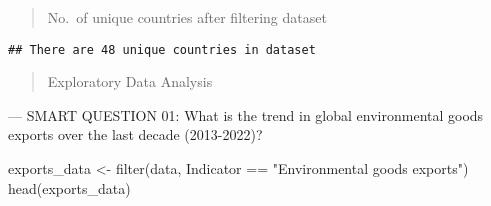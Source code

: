 \documentclass[
]{article}
\newenvironment{Shaded}{\begin{snugshade}}{\end{snugshade}}
\newcommand{\FunctionTok}[1]{\textcolor[rgb]{0.00,0.00,0.00}{#1}}
\newcommand{\NormalTok}[1]{#1}
\newcommand{\OtherTok}[1]{\textcolor[rgb]{0.56,0.35,0.01}{#1}}
\newcommand{\SpecialCharTok}[1]{\textcolor[rgb]{0.00,0.00,0.00}{#1}}
\newcommand{\StringTok}[1]{\textcolor[rgb]{0.31,0.60,0.02}{#1}}
\begin{document}
\begin{quote}
No.~of unique countries after filtering dataset
\end{quote}

\begin{Shaded}
\end{Shaded}

\begin{verbatim}
## There are 48 unique countries in dataset
\end{verbatim}

\begin{quote}
Exploratory Data Analysis
\end{quote}

--- SMART QUESTION 01: What is the trend in global environmental goods
exports over the last decade (2013-2022)?

\begin{Shaded}
\begin{Highlighting}[]
\NormalTok{exports\_data }\OtherTok{\textless{}{-}} \FunctionTok{filter}\NormalTok{(data, Indicator }\SpecialCharTok{==} \StringTok{"Environmental goods exports"}\NormalTok{) }
\FunctionTok{head}\NormalTok{(exports\_data)}
\end{Highlighting}
\end{Shaded}
\end{document}
